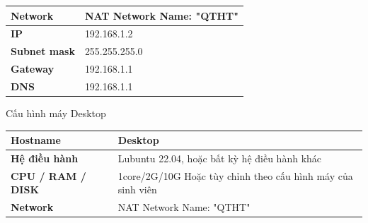 \documentclass[a4paper, 11pt]{article}
\begin{document}
\begin{itemize}
\begin{multicols}{2}
\begin{minipage}{\linewidth}
\begin{tabular}{| p{.3\linewidth} | p{.4\linewidth} |}
                      \textbf{Network}          & NAT Network \newline Name: "QTHT"                                    \\
                      \hline

                      \textbf{IP}               & 192.168.1.2                                                          \\
                      \hline

                      \textbf{Subnet mask}      & 255.255.255.0                                                        \\
                      \hline

                      \textbf{Gateway}          & 192.168.1.1                                                          \\
                      \hline

                      \textbf{DNS}              & 192.168.1.1                                                          \\
                      \hline
                  \end{tabular}
              \end{minipage}

              \begin{minipage}{\linewidth}
                  \captionsetup{type=table}
                  \caption{Cấu hình máy Desktop}
                  \centering
                  \begin{tabular}{| p{.3\linewidth} | p{.4\linewidth} |}
                      \hline
                      \textbf{Hostname}                                              & Desktop                                                              \\
                      \hline

                      \textbf{Hệ điều hành}                                          & Lubuntu 22.04, \newline hoặc bất kỳ hệ điều hành khác                \\
                      \hline

                      \textbf{CPU / RAM / DISK}                                      & 1core/2G/10G \newline Hoặc tùy chỉnh theo cấu hình máy của sinh viên \\
                      \hline

                      \textbf{Network}                                               & NAT Network \newline Name: "QTHT"                                    \\
                      \hline


\end{tabular}
\end{minipage}
\end{multicols}
\end{itemize}
\end{document}
